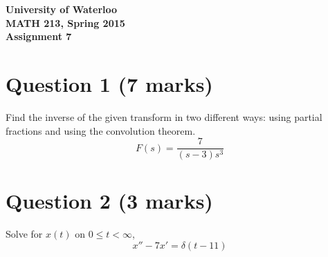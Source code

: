 \documentclass[12pt]{article}
\begin{document}
\begin{center}
{\Large\bf University of Waterloo}\\
\vspace{3mm}
{\Large\bf MATH 213, Spring 2015}\\
\vspace{2mm}
{\Large\bf Assignment 7}\\
\end{center}

\section*{Question 1 (7 marks)}
Find the inverse of the given transform in two different ways: using partial fractions and using the convolution theorem. $$F(s) = \frac{7}{(s-3)s^3}$$

\section*{Question 2 (3 marks)}
Solve for $x(t)$ on $0 \leq t < \infty$, $$x''-7x'=\delta(t-11)$$
\end{document}
